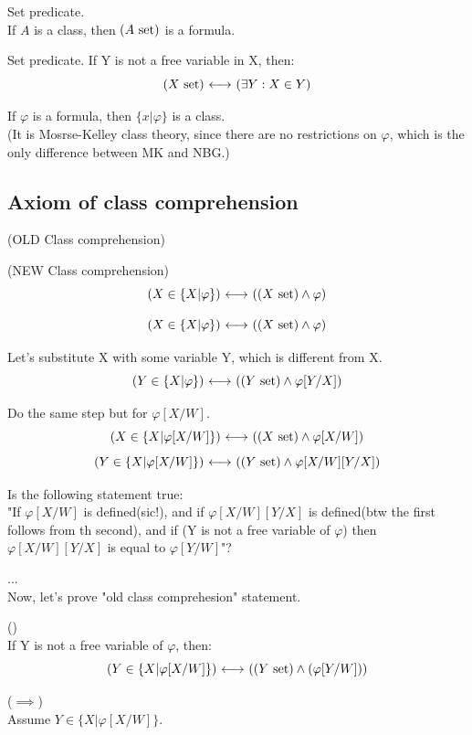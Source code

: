 \begin{constructor} Set predicate.\\
If $A$ is a class, then $(A\mathrm{\ set})$ is a formula.
\end{constructor}
\begin{definition} Set predicate.
If Y is not a free variable in X, then:
\[
(X\mathrm{\ set}){\ \longleftrightarrow\ }(\exists Y:X\in Y)
\]
\end{definition}


\begin{constructor}
If $\varphi$ is a formula, then $\{x|\varphi\}$ is a class.\\
(It is Mosrse-Kelley class theory, since there are no restrictions on $\varphi$, which is the only difference between MK and NBG.)
\end{constructor}
\subsection{Axiom of class comprehension}
\begin{axiom}(OLD Class comprehension)
\label{axm:comprehension}
\end{axiom}
\begin{axiom}(NEW Class comprehension)
\label{axm:comprehension}
\[
(X\in\{X|\varphi\}) {\ \longleftrightarrow\ } ((X\mathrm{\ set})\land \varphi)
\]
\end{axiom}


\[
(X\in\{X|\varphi\}) {\ \longleftrightarrow\ } ((X\mathrm{\ set})\land \varphi)
\]

Let's substitute X with some variable Y, which is different from X.\\
\[
(Y\in\{X|\varphi\}) {\ \longleftrightarrow\ } ((Y\mathrm{\ set})\land \varphi[Y/X])
\]

Do the same step but for $\varphi[X/W]$.
\[
(X\in\{X|\varphi[X/W]\}) {\ \longleftrightarrow\ } ((X\mathrm{\ set})\land \varphi[X/W])
\]
\[
(Y\in\{X|\varphi[X/W]\}) {\ \longleftrightarrow\ } ((Y\mathrm{\ set})\land \varphi[X/W][Y/X])
\]

Is the following statement true:\\
"If
$\varphi[X/W]$ is defined(sic!), and if $\varphi[X/W][Y/X]$ is defined(btw the first follows from th second), and if (Y is not a free variable of $\varphi$) then $\varphi[X/W][Y/X]$ is equal to $\varphi[Y/W]$"?

...\\


Now, let's prove "old class comprehesion" statement.\\
\begin{theorem}()\\
If Y is not a free variable of $\varphi$, then:
\[
(Y\in\{X|\varphi[X/W]\}) {\ \longleftrightarrow\ } ((Y\mathrm{\ set})\land(\varphi[Y/W]))
\]
\end{theorem}
\Proof
($\implies$)\\
Assume $Y\in\{X|\varphi[X/W]\}$.\\

